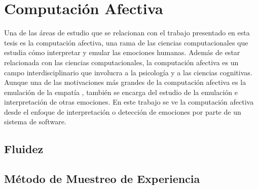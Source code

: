 
\chapter{Computación Afectiva}

Una de las áreas de estudio que se relacionan con el trabajo presentado en esta tesis es la computación afectiva, una rama de las ciencias computacionales que estudia cómo interpretar y emular las emociones humanas. Además de estar relacionada con las ciencias computacionales, la computación afectiva es un campo interdisciplinario que involucra a la psicología y a las ciencias cognitivas. Aunque una de las motivaciones más grandes de la computación afectiva es la emulación de la empatía \cite{diamond2003love} \cite{picard2000affective}, también se encarga del estudio de la emulación e interpretación de otras emociones. En este trabajo se ve la computación afectiva desde el enfoque de interpretación o detección de emociones por parte de un sistema de software.


\section{Fluidez}

\section{Método de Muestreo de Experiencia}

